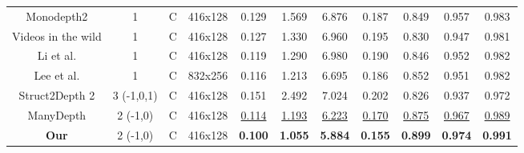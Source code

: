 \documentclass[journal]{IEEEtran}
\begin{document}
\begin{table*}
\begin{tabular}{ccccccccccc}
Monodepth2 \cite{monodepth2}                      & 1                            & C                        & 416x128              & 0.129   & 1.569  & 6.876  & 0.187   & 0.849           & 0.957             & 0.983             \\
Videos in the wild \cite{gordon2019depth}         & 1                            & C                        & 416x128              & 0.127   & 1.330  & 6.960  & 0.195   & 0.830           & 0.947             & 0.981             \\
Li et al. \cite{li2020unsupervised}               & 1                            & C                        & 416x128              & 0.119   & 1.290  & 6.980  & 0.190   & 0.846           & 0.952             & 0.982             \\
Lee et al. \cite{lee2021attentive}                & 1                            & C                        & 832x256              & 0.116   & 1.213  & 6.695  & 0.186   & 0.852           & 0.951             & 0.982             \\
Struct2Depth 2 \cite{casser2019}                  & 3 (-1,0,1)                   & C                        & 416x128              & 0.151   & 2.492  & 7.024  & 0.202   & 0.826           & 0.937             & 0.972             \\
ManyDepth \cite{manydepth}                        & 2 (-1,0)                     & C                        & 416x128              & \underline{0.114}   & \underline{1.193}  & \underline{6.223}  & \underline{0.170}   & \underline{0.875}           & \underline{0.967}             & \underline{0.989}             \\
\textbf{Our}                                                                & 2 (-1,0)                     & C                        & 416x128              & \textbf{0.100}   & \textbf{1.055}  & \textbf{5.884}  & \textbf{0.155}  & \textbf{0.899}           & \textbf{0.974}             & \textbf{0.991}             \\ \bottomrule[1pt]
\end{tabular}
\end{table*}
\end{document}
